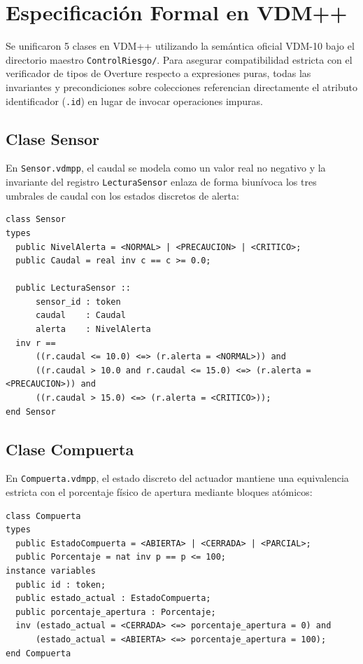 \documentclass[conference]{IEEEtran}
\begin{document}
\section{Especificación Formal en VDM++}
Se unificaron 5 clases en VDM++ utilizando la semántica oficial VDM-10 \cite{larsen2010vdmmanual} bajo el directorio maestro \texttt{ControlRiesgo/}. Para asegurar compatibilidad estricta con el verificador de tipos de Overture respecto a expresiones puras, todas las invariantes y precondiciones sobre colecciones referencian directamente el atributo identificador (\texttt{.id}) en lugar de invocar operaciones impuras.

\subsection{Clase Sensor}
En \texttt{Sensor.vdmpp}, el caudal se modela como un valor real no negativo y la invariante del registro \texttt{LecturaSensor} enlaza de forma biunívoca los tres umbrales de caudal con los estados discretos de alerta:

\begin{lstlisting}[caption={Invariante completo en Sensor.vdmpp}]
class Sensor
types
  public NivelAlerta = <NORMAL> | <PRECAUCION> | <CRITICO>;
  public Caudal = real inv c == c >= 0.0;

  public LecturaSensor ::
      sensor_id : token
      caudal    : Caudal
      alerta    : NivelAlerta
  inv r ==
      ((r.caudal <= 10.0) <=> (r.alerta = <NORMAL>)) and
      ((r.caudal > 10.0 and r.caudal <= 15.0) <=> (r.alerta = <PRECAUCION>)) and
      ((r.caudal > 15.0) <=> (r.alerta = <CRITICO>));
end Sensor
\end{lstlisting}

\subsection{Clase Compuerta}
En \texttt{Compuerta.vdmpp}, el estado discreto del actuador mantiene una equivalencia estricta con el porcentaje físico de apertura mediante bloques atómicos:

\begin{lstlisting}[caption={Fragmento de Compuerta.vdmpp}]
class Compuerta
types
  public EstadoCompuerta = <ABIERTA> | <CERRADA> | <PARCIAL>;
  public Porcentaje = nat inv p == p <= 100;
instance variables
  public id : token;
  public estado_actual : EstadoCompuerta;
  public porcentaje_apertura : Porcentaje;
  inv (estado_actual = <CERRADA> <=> porcentaje_apertura = 0) and
      (estado_actual = <ABIERTA> <=> porcentaje_apertura = 100);
end Compuerta
\end{lstlisting}
\end{document}
